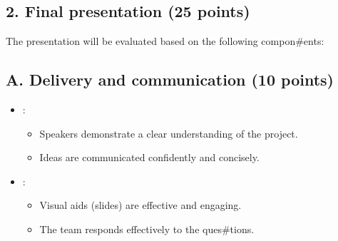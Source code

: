 \documentclass[letterpaper,10pt,english]{jupyterBook}
\begin{document}
\subsection{2. Final presentation (25 points)}
\label{\detokenize{ProjectSyllabus:final-presentation-25-points}}
\sphinxAtStartPar
The presentation will be evaluated based on the following compon\#ents:


\subsection{A. Delivery and communication (10 points)}
\label{\detokenize{ProjectSyllabus:a-delivery-and-communication-10-points}}\begin{itemize}
\item {} 
\sphinxAtStartPar
{}:
\begin{itemize}
\item {} 
\sphinxAtStartPar
Speakers demonstrate a clear understanding of the project.

\item {} 
\sphinxAtStartPar
Ideas are communicated confidently and concisely.

\end{itemize}

\item {} 
\sphinxAtStartPar
{}:
\begin{itemize}
\item {} 
\sphinxAtStartPar
Visual aids (slides) are effective and engaging.

\item {} 
\sphinxAtStartPar
The team responds effectively to the ques\#tions.

\end{itemize}

\end{itemize}
\end{document}
